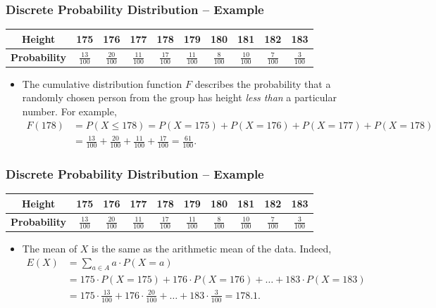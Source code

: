 \documentclass[aspectratio=169,11pt,usenames,dvipsnames]{beamer}
\begin{document}
\begin{frame}
 \frametitle{Discrete Probability Distribution -- Example}
 \begin{center}
  \begin{tabular}{c|ccccccccc}
   \textbf{Height} & 175 & 176 & 177 & 178 & 179 & 180 & 181 & 182 & 183\\
   \midrule
   \textbf{Probability} & $\frac{13}{100}$ & $\frac{20}{100}$ & $\frac{11}{100}$
                        & $\frac{17}{100}$ & $\frac{11}{100}$ & $\frac{8}{100}$
                        & $\frac{10}{100}$ & $\frac{7}{100}$ & $\frac{3}{100}$
  \end{tabular}
 \end{center}
 \begin{itemize}
  \item The \alert{cumulative distribution function} $F$ describes the
   probability that a randomly chosen person from the group has height
   \emph{less than} a particular number. \pause For example,
   \begin{align*}
    F(178) &= P(X \leq 178) = P(X = 175) + P(X = 176) + P(X = 177) + P(X =
    178)\\
           &= \frac{13}{100} + \frac{20}{100} + \frac{11}{100} + \frac{17}{100}
           = \frac{61}{100}.
   \end{align*}
 \end{itemize}
\end{frame}

\begin{frame}
 \frametitle{Discrete Probability Distribution -- Example}
 \begin{center}
  \begin{tabular}{c|ccccccccc}
   \textbf{Height} & 175 & 176 & 177 & 178 & 179 & 180 & 181 & 182 & 183\\
   \midrule
   \textbf{Probability} & $\frac{13}{100}$ & $\frac{20}{100}$ & $\frac{11}{100}$
                        & $\frac{17}{100}$ & $\frac{11}{100}$ & $\frac{8}{100}$
                        & $\frac{10}{100}$ & $\frac{7}{100}$ & $\frac{3}{100}$
  \end{tabular}
 \end{center}
 \begin{itemize}
  \item The \alert{mean} of $X$ is the same as the arithmetic mean of the data.
   Indeed,
   \begin{align*}
    E(X) &= \sum_{a \in A} a \cdot P(X = a)\\
         &= 175 \cdot P(X = 175) + 176 \cdot P(X = 176) + \ldots + 183 \cdot P(X
         = 183)\\
         &= 175 \cdot \frac{13}{100} + 176 \cdot \frac{20}{100} + \ldots + 183
         \cdot \frac{3}{100} = 178.1.
   \end{align*}
 \end{itemize}
\end{frame}
\end{document}
